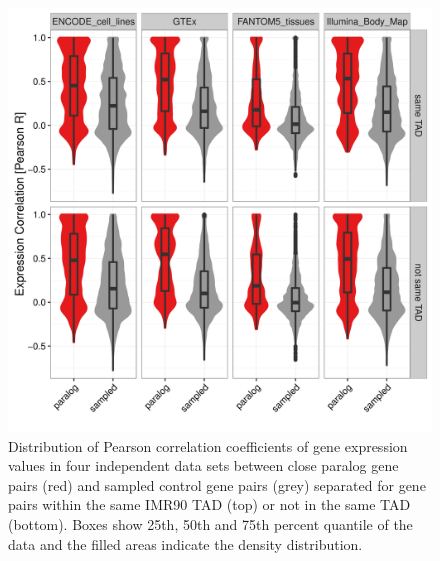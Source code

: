 \documentclass[a4paper,twoside=true,openright,parskip=full,chapterprefix=true,11pt,headings=normal,bibliography=totoc,listof=totoc,titlepage=on,captions=tableabove,draft=false]{scrreprt}
\theoremstyle{definition}
\theoremstyle{definition}
\theoremstyle{definition}
\theoremstyle{remark}
\begin{document}
\begin{figure}

{\centering \includegraphics[width=0.5\linewidth]{figures/paralog/SI/figS10} 

}

\caption{Distribution of Pearson correlation coefficients of gene
expression values in four independent data sets between close paralog
gene pairs (red) and sampled control gene pairs (grey) separated for
gene pairs within the same IMR90 TAD (top) or not in the same TAD
(bottom). Boxes show 25th, 50th and 75th percent quantile of the data
and the filled areas indicate the density distribution.}\label{fig:ExpByTAD}
\end{figure}
\end{document}
